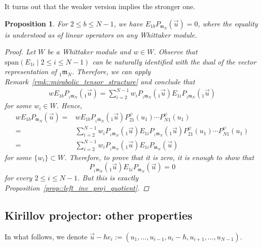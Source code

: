 \documentclass[10pt,a4paper]{article}
\numberwithin{equation}{section}
\newtheorem{Proposition}[Theorem]{Proposition}
{ \theoremstyle{definition}
	\newtheorem{Definition}[Theorem]{Definition}
	\newtheorem{Note}[Theorem]{Note}
	\newtheorem{Example}[Theorem]{Example}
	\newtheorem{Remark}[Theorem]{Remark} }
\newcommand{\m}{\mathfrak{m}}
\begin{document}
	It turns out that the weaker version implies the stronger one.
	\begin{Proposition}
		For $2 \leq b \leq N-1$, we have
		$
		E_{1b} P_{\m_N}(\vec{u}) = 0$,
		where the equality is understood as of linear operators on any Whittaker module.
		\begin{proof}
			Let $W$ be a Whittaker module and $w\in W$. Observe that $\mathrm{span}(E_{1i}\mid 2 \leq i \leq N-1)$ can be naturally identified with the dual of the vector representation of ${}_1 \m_N$. Therefore, we can apply Remark~\ref{rmk::mirabolic_tensor_structure} and conclude that
			\begin{align*}
				w E_{1b}P_{{}_1\m_N}({}_1\vec{u}) = \sum\limits_{i=2}^{N-1} w_i P_{{}_1\m_N}({}_1\vec{u}) E_{1i} P_{{}_1\m_N}({}_1\vec{u})
			\end{align*}
			for some $w_i \in W$. Hence,
			\begin{align*}
				w E_{1b} P_{\m_N}(\vec{u})
				={}&w E_{1b}P_{{}_1\m_N}({}_1\vec{u}) P_{21}^{\psi}(u_1) \cdots P_{N1}^{\psi}(u_1) \\
				={}& \sum\limits_{i=2}^{N-1} w_i P_{{}_1\m_N}({}_1\vec{u}) E_{1i} P_{{}_1\m_N}({}_1\vec{u}) P_{21}^{\psi}(u_1) \cdots P_{N1}^{\psi}(u_1) \\
				={}&\sum\limits_{i=2}^{N-1} w_i P_{{}_1\m_N}({}_1\vec{u}) E_{1i} P_{\m_N}(\vec{u})
			\end{align*}
			for some $\{w_i\}\subset W$. Therefore, to prove that it is zero, it is enough to show that
			\[
			P_{{}_1\m_N}({}_1\vec{u}) E_{1i} P_{\m_N}(\vec{u}) = 0
			\]
			for every $2\leq i \leq N-1$. But this is exactly Proposition~\ref{prop::left_inv_proj_quotient}.
		\end{proof}
	\end{Proposition}
	
	\subsection{Kirillov projector: other properties}
	\label{subsect::kirillov_proj_last_col}
	
	In what follows, we denote
$
	\vec{u} - \hbar e_i := (u_1,\dots, u_{i-1},u_i - \hbar, u_{i+1},\dots,u_{N-1})$.
	
\end{document}
